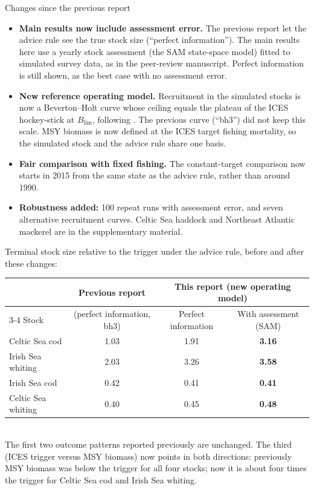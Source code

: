 \documentclass[11pt,a4paper]{article}
\newcommand{\Blim}{B_{\mathrm{lim}}}
\begin{document}
\begin{changebox}{Changes since the previous report}
\begin{itemize}
\item \textbf{Main results now include assessment error.} The previous
report let the advice rule see the true stock size (``perfect
information''). The main results here use a yearly stock assessment (the
SAM state-space model) fitted to simulated survey data, as in the
peer-review manuscript. Perfect information is still shown, as the best
case with no assessment error.
\item \textbf{New reference operating model.} Recruitment in the simulated
stocks is now a Beverton--Holt curve whose ceiling equals the plateau of
the ICES hockey-stick at $\Blim$, following \citet{winker2026rebuilding}.
The previous curve (``bh3'') did not keep this scale. MSY biomass is
now defined at the ICES target fishing mortality, so the simulated stock
and the advice rule share one basis.
\item \textbf{Fair comparison with fixed fishing.} The constant-target
comparison now starts in 2015 from the same state as the advice rule,
rather than around 1990.
\item \textbf{Robustness added:} 100 repeat runs with assessment error, and
seven alternative recruitment curves. Celtic Sea haddock and Northeast
Atlantic mackerel are in the supplementary material.
\end{itemize}
Terminal stock size relative to the trigger under the advice rule, before
and after these changes:\\[0.3em]
\small
\begin{tabular}{@{}lccc@{}}
\toprule
 & Previous report & \multicolumn{2}{c}{This report (new operating model)} \\
\cmidrule(lr){3-4}
Stock & (perfect information, bh3) & Perfect information & With assessment (SAM) \\
\midrule
Celtic Sea cod     & 1.03 & 1.91 & \textbf{3.16} \\
Irish Sea whiting  & 2.03 & 3.26 & \textbf{3.58} \\
Irish Sea cod      & 0.42 & 0.41 & \textbf{0.41} \\
Celtic Sea whiting & 0.40 & 0.45 & \textbf{0.48} \\
\bottomrule
\end{tabular}\\[0.3em]
\normalsize
The first two outcome patterns reported previously are unchanged. The
third (ICES trigger versus MSY biomass) now points in both directions:
previously MSY biomass was below the trigger for all four stocks; now it is
about four times the trigger for Celtic Sea cod and Irish Sea whiting.
\end{changebox}
\end{document}
